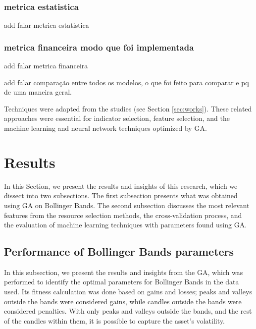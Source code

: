 \documentclass{ieeeaccess}
\begin{document}
\subsubsection{metrica estatistica}
add falar metrica estatistica

\subsubsection{metrica financeira modo que foi implementada}
add falar metrica financeira

add falar comparação entre todos os modelos, o que foi feito para comparar e pq de uma maneira geral.



Techniques were adapted from the studies \cite{bandgar2025finchronos, simatupang2026stock, sekhar2025stock, yu2025multi, mittal2025machine, sukma2025enhancing, guo2025empirical, bareket2024adaptive, mutinda2026hybrid, vivek2025optimal, rahim2025technical, hung2024ai} (see Section \ref{sec:works}). These related approaches were essential for indicator selection, feature selection, and the machine learning and neural network techniques optimized by GA.

\section{Results}
\label{sec:results}
In this Section, we present the results and insights of this research, which we dissect into two subsections. The first subsection presents what was obtained using GA on Bollinger Bands. The second subsection discusses the most relevant features from the resource selection methods, the cross-validation process, and the evaluation of machine learning techniques with parameters found using GA.

\subsection{Performance of Bollinger Bands parameters}

In this subsection, we present the results and insights from the GA, which was performed to identify the optimal parameters for Bollinger Bands in the data used. Its fitness calculation was done based on gains and losses; peaks and valleys outside the bands were considered gains, while candles outside the bands were considered penalties. With only peaks and valleys outside the bands, and the rest of the candles within them, it is possible to capture the asset's volatility.
\end{document}
